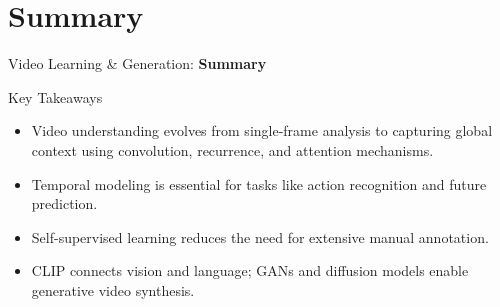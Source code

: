 \section{Summary}
\begin{frame}{}
    \LARGE Video Learning \& Generation: \textbf{Summary}
\end{frame}

\begin{frame}{Key Takeaways}
    \large
    \begin{itemize}
        \item Video understanding evolves from single-frame analysis to capturing global context using convolution, recurrence, and attention mechanisms.
        \item Temporal modeling is essential for tasks like action recognition and future prediction.
        \item Self-supervised learning reduces the need for extensive manual annotation.
        \item CLIP connects vision and language; GANs and diffusion models enable generative video synthesis.
    \end{itemize}
\end{frame}